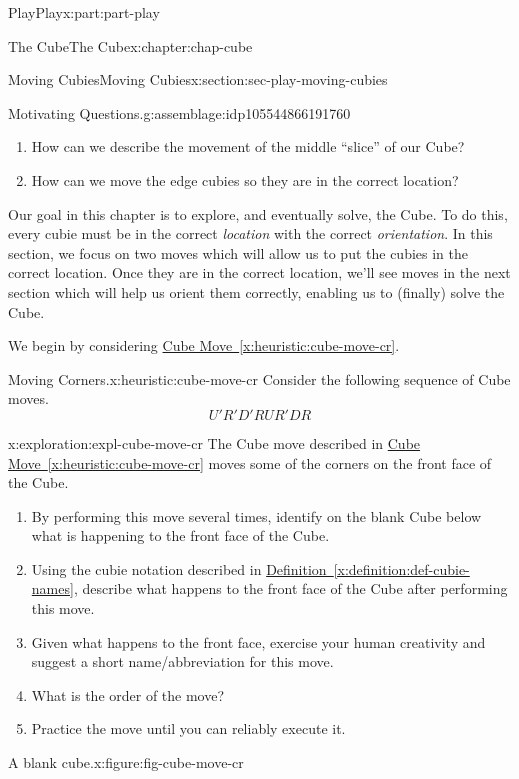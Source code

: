\documentclass[oneside,10pt,]{book}
\newcommand{\xreffont}{\relax}
\numberwithin{equation}{section}
\begin{document}
\begin{partptx}{Play}{}{Play}{}{}{x:part:part-play}
\begin{chapterptx}{The Cube}{}{The Cube}{}{}{x:chapter:chap-cube}
\begin{sectionptx}{Moving Cubies}{}{Moving Cubies}{}{}{x:section:sec-play-moving-cubies}
\begin{assemblage}{Motivating Questions.}{g:assemblage:idp105544866191760}
\begin{enumerate}
\item{}How can we describe the movement of the middle ``slice'' of our Cube?%
\item{}How can we move the edge cubies so they are in the correct location?%
\end{enumerate}
%
\end{assemblage}
\begin{introduction}{}%
Our goal in this chapter is to explore, and eventually solve, the Cube. To do this, every cubie must be in the correct \emph{location} with the correct \emph{orientation}. In this section, we focus on two moves which will allow us to put the cubies in the correct location. Once they are in the correct location, we'll see moves in the next section which will help us orient them correctly, enabling us to (finally) solve the Cube.%
\end{introduction}%
We begin by considering \hyperref[x:heuristic:cube-move-cr]{Cube Move~{\xreffont\ref{x:heuristic:cube-move-cr}}}.%
\begin{heuristic}{Moving Corners.}{}{x:heuristic:cube-move-cr}%
Consider the following sequence of Cube moves.%
%
\begin{equation*}
U' R' D' R U R' D R
\end{equation*}
\end{heuristic}
\begin{exploration}{}{x:exploration:expl-cube-move-cr}%
The Cube move described in \hyperref[x:heuristic:cube-move-cr]{Cube Move~{\xreffont\ref{x:heuristic:cube-move-cr}}} moves some of the corners on the front face of the Cube.%
%
\begin{enumerate}
\item{}By performing this move several times, identify on the blank Cube below what is happening to the front face of the Cube.%
\item{}Using the cubie notation described in \hyperref[x:definition:def-cubie-names]{Definition~{\xreffont\ref{x:definition:def-cubie-names}}}, describe what happens to the front face of the Cube after performing this move.%
\item{}Given what happens to the front face, exercise your human creativity and suggest a short name\slash{}abbreviation for this move.%
\item{}What is the order of the move?%
\item{}Practice the move until you can reliably execute it.%
\end{enumerate}
\begin{figureptx}{A blank cube.}{x:figure:fig-cube-move-cr}{}%

\end{figureptx}
\end{exploration}
\end{sectionptx}
\end{chapterptx}
\end{partptx}
\end{document}
